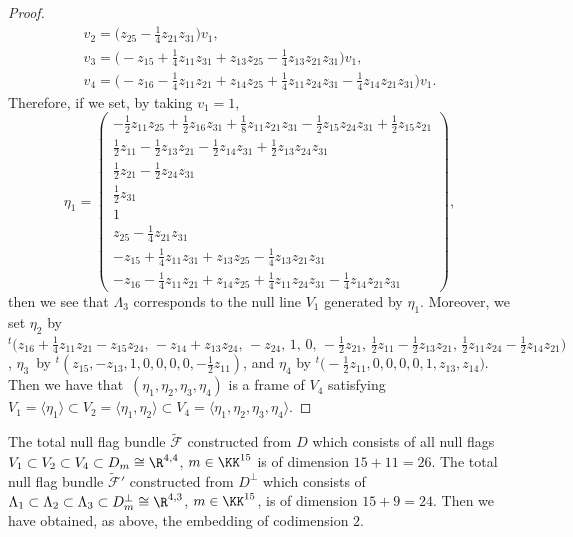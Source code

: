 \begin{proof}
\begin{gather*}
v_2 = \biggl(z_{25} -\frac{1}{4}z_{21}z_{31}\biggr)v_1,
\\
v_3 = \biggl(- z_{15} + \frac{1}{4}z_{11}z_{31} + z_{13}z_{25} - \frac{1}{4}z_{13}z_{21}z_{31}\biggr)v_1,
\\
v_4 = \biggl(- z_{16} - \frac{1}{4}z_{11}z_{21} + z_{14}z_{25} + \frac{1}{4}z_{11}z_{24}z_{31}
- \frac{1}{4}z_{14}z_{21}z_{31}\biggr)v_1.
\end{gather*}
Therefore, if we set, by taking $v_1 = 1$,
\[
\eta_1 =
\begin{pmatrix}
- \frac{1}{2}z_{11}z_{25} + \frac{1}{2}z_{16}z_{31} + \frac{1}{8}z_{11}z_{21}z_{31}
- \frac{1}{2}z_{15}z_{24}z_{31} + \frac{1}{2}z_{15}z_{21}
\\
\frac{1}{2}z_{11} - \frac{1}{2}z_{13}z_{21} - \frac{1}{2}z_{14}z_{31} + \frac{1}{2}z_{13}z_{24}z_{31}
\\
\frac{1}{2}z_{21} - \frac{1}{2}z_{24}z_{31}
\\
\frac{1}{2}z_{31}
\\
1
\\
z_{25} -\frac{1}{4}z_{21}z_{31}
\\
- z_{15} + \frac{1}{4}z_{11}z_{31} + z_{13}z_{25} - \frac{1}{4}z_{13}z_{21}z_{31}
\\
- z_{16} - \frac{1}{4}z_{11}z_{21} + z_{14}z_{25} + \frac{1}{4}z_{11}z_{24}z_{31} - \frac{1}{4}z_{14}z_{21}z_{31}
\end{pmatrix},
\]
then we see that $\Lambda_3$ corresponds to the null line $V_1$ generated by $\eta_1$.
Moreover, we set $\eta_2$ by
$
{}^t\bigl(z_{16} + \frac{1}{4}z_{11}z_{21} - z_{15}z_{24}, \,- z_{14} + z_{13}z_{24}, \, - z_{24}, \,1, \,0, \,- \frac{1}{2}z_{21}, \,
\frac{1}{2}z_{11} - \frac{1}{2}z_{13}z_{21}, \,\frac{1}{2}z_{11}z_{24} - \frac{1}{2}z_{14}z_{21}\bigr)
$,
$\eta_3$~by ${}^t(z_{15}, - z_{13}, 1, 0, 0, 0, 0, - \frac{1}{2}z_{11})
$, and $\eta_4$ by
$
{}^t\bigl(-\frac{1}{2}z_{11}, 0, 0, 0, 0, 1, z_{13}, z_{14}\bigr)
$.
Then we have that~$(\eta_1, \eta_2, \eta_3, \eta_4)$ is a frame of $V_4$ satisfying
$V_1 = \langle \eta_1\rangle \subset V_2 = \langle \eta_1, \eta_2\rangle \subset V_4 = \langle \eta_1, \eta_2, \eta_3, \eta_4\rangle$.
\end{proof}

\ber
{\rm
The total null flag bundle $\widetilde{\mathcal F}$ constructed from $D$ which consists of all null flags $V_1 \subset V_2 \subset V_4 \subset D_m \cong \R^{4,4}$, $m \in \KK^{15}$
is of dimension $15 + 11 = 26$.
The total null flag bundle $\widetilde{\mathcal F}'$ constructed from $D^\perp$ which consists of $\Lambda_1 \subset
\Lambda_2 \subset \Lambda_3 \subset D^\perp_m \cong \R^{4,3}$, $m \in \KK^{15}$, is of dimension $15+9 = 24$.
Then we have obtained, as above, the embedding  of codimension $2$.
}
\enr


